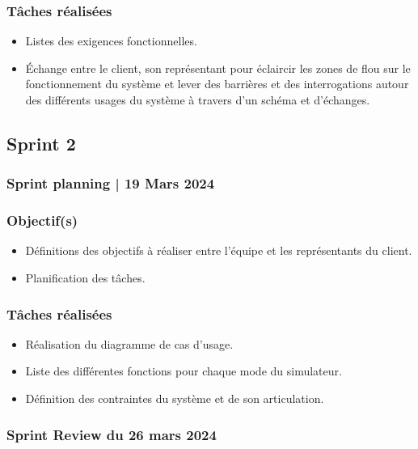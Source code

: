 		\subsubsection*{Tâches réalisées}
		\begin{itemize}
			\item Listes des exigences fonctionnelles.
			\item Échange entre le client, son représentant pour éclaircir les zones de flou sur le fonctionnement du système et lever des barrières et des interrogations autour des différents usages du système à travers d’un schéma et d’échanges.
		\end{itemize}



\subsection{Sprint 2}
	
	\subsubsection{Sprint planning | 19 Mars 2024}
	\subsubsection*{Objectif(s)}
	\begin{itemize}
		\item Définitions des objectifs à réaliser entre l’équipe et les représentants du client.
		\item Planification des tâches.
	\end{itemize}
	
	\subsubsection*{Tâches réalisées}
	\begin{itemize}
		\item Réalisation du diagramme de cas d’usage.
		\item Liste des différentes fonctions pour chaque mode du simulateur.
		\item Définition des contraintes du système et de son articulation.
	\end{itemize}
	
	\subsubsection{Sprint Review du 26 mars 2024}
	
